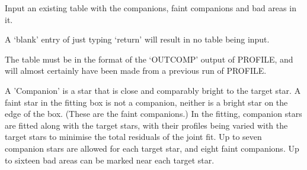 {{{ Input an existing table with the companions, faint companions and
 bad areas in it.
                                                                               
 A `blank' entry of just typing `return' will result in no table being
 input.
                                                                               
 The table must be in the format of the `OUTCOMP' output of PROFILE, and
 will almost certainly have been made from a previous run of PROFILE.
                                                                               
 A 'Companion' is a star that is close and comparably bright
 to the target star. A faint star in the fitting box is not a companion,
 neither is a bright star on the edge of the box. (These are the faint
 companions.) In the fitting, companion stars are fitted along with
 the target stars, with their profiles being varied with the target stars
 to minimise the total residuals of the joint fit. Up to seven
 companion stars are allowed for each target star, and eight faint
 companions. Up to sixteen bad areas can be marked near each target star.
                                                                               
}}}
